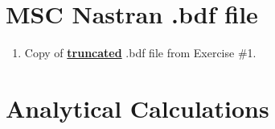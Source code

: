 \documentclass[11pt,a4paper,oneside]{memoir}
\begin{document}
\appendix

\chapter{MSC Nastran .bdf file}\label{chap:a}
\begin{enumerate}
	\item Copy of \underline{\textbf{truncated}} .bdf file from Exercise \#1.
\end{enumerate}

\chapter{Analytical Calculations}\label{chap:b}



\end{document}
